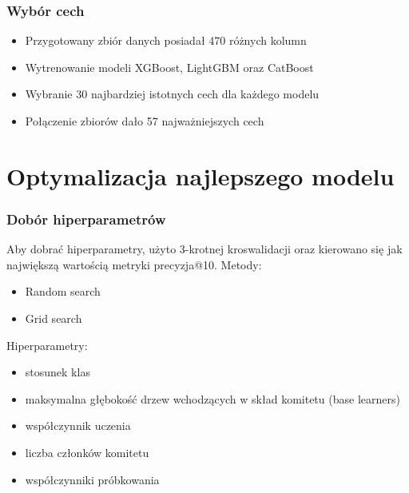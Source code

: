 \documentclass{beamer}
\begin{document}
    \begin{frame}
        \frametitle{Wybór cech}
        \begin{itemize}
            \item Przygotowany zbiór danych posiadał 470 różnych kolumn
            \item Wytrenowanie modeli XGBoost, LightGBM oraz CatBoost
            \item Wybranie 30 najbardziej istotnych cech dla każdego modelu
            \item Połączenie zbiorów dało 57 najważniejszych cech
        \end{itemize}
    \end{frame}

    \section{Optymalizacja najlepszego modelu}

    \begin{frame}
        \frametitle{Dobór hiperparametrów}
        Aby dobrać hiperparametry, użyto 3-krotnej kroswalidacji oraz kierowano się jak największą wartością metryki precyzja@10.
        Metody:
        \begin{itemize}
            \item Random search
            \item Grid search
        \end{itemize}
        Hiperparametry:
        \begin{itemize}
            \item stosunek klas
            \item maksymalna głębokość drzew wchodzących w skład komitetu (base learners)
            \item współczynnik uczenia
            \item liczba członków komitetu
            \item współczynniki próbkowania
        \end{itemize}
    \end{frame}
\end{document}
